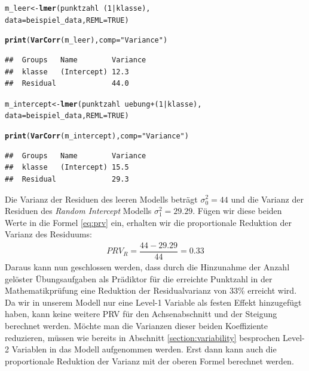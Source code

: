\documentclass[12pt]{article}\usepackage[]{graphicx}\usepackage[]{color}
\makeatletter
\newcommand{\hlnum}[1]{\textcolor[rgb]{0.686,0.059,0.569}{#1}}%
\newcommand{\hlstr}[1]{\textcolor[rgb]{0.192,0.494,0.8}{#1}}%
\newcommand{\hlopt}[1]{\textcolor[rgb]{0,0,0}{#1}}%
\newcommand{\hlstd}[1]{\textcolor[rgb]{0.345,0.345,0.345}{#1}}%
\newcommand{\hlkwb}[1]{\textcolor[rgb]{0.69,0.353,0.396}{#1}}%
\newcommand{\hlkwc}[1]{\textcolor[rgb]{0.333,0.667,0.333}{#1}}%
\newcommand{\hlkwd}[1]{\textcolor[rgb]{0.737,0.353,0.396}{\textbf{#1}}}%
\newenvironment{kframe}{%
 \def\at@end@of@kframe{}%
 \ifinner\ifhmode%
  \def\at@end@of@kframe{\end{minipage}}%
  \begin{minipage}{\columnwidth}%
 \fi\fi%
 \def\FrameCommand##1{\hskip\@totalleftmargin \hskip-\fboxsep
 \colorbox{shadecolor}{##1}\hskip-\fboxsep
     \hskip-\linewidth \hskip-\@totalleftmargin \hskip\columnwidth}%
 \MakeFramed {\advance\hsize-\width
   \@totalleftmargin\z@ \linewidth\hsize
   \@setminipage}}%
 {\par\unskip\endMakeFramed%
 \at@end@of@kframe}
\newenvironment{knitrout}{}{} %
\makeatother
\begin{document}
\singlespacing
\begin{knitrout}
\color{fgcolor}\begin{kframe}
\begin{alltt}
\hlstd{m_leer} \hlkwb{<-} \hlkwd{lmer}\hlstd{(punktzahl} \hlopt{~} \hlstd{(}\hlnum{1} \hlopt{|} \hlstd{klasse),}
                \hlkwc{data} \hlstd{= beispiel_data,} \hlkwc{REML} \hlstd{=} \hlnum{TRUE}\hlstd{)}

\hlkwd{print}\hlstd{(}\hlkwd{VarCorr}\hlstd{(m_leer),} \hlkwc{comp} \hlstd{=} \hlstr{"Variance"}\hlstd{)}
\end{alltt}
\begin{verbatim}
##  Groups   Name        Variance
##  klasse   (Intercept) 12.3    
##  Residual             44.0
\end{verbatim}
\begin{alltt}
\hlstd{m_intercept} \hlkwb{<-} \hlkwd{lmer}\hlstd{(punktzahl} \hlopt{~} \hlstd{uebung} \hlopt{+} \hlstd{(}\hlnum{1} \hlopt{|} \hlstd{klasse),}
                \hlkwc{data} \hlstd{= beispiel_data,} \hlkwc{REML} \hlstd{=} \hlnum{TRUE}\hlstd{)}

\hlkwd{print}\hlstd{(}\hlkwd{VarCorr}\hlstd{(m_intercept),} \hlkwc{comp} \hlstd{=} \hlstr{"Variance"}\hlstd{)}
\end{alltt}
\begin{verbatim}
##  Groups   Name        Variance
##  klasse   (Intercept) 15.5    
##  Residual             29.3
\end{verbatim}
\end{kframe}
\end{knitrout}



Die Varianz der Residuen des leeren Modells beträgt $\sigma_{0}^2 = 44$ und die Varianz der Residuen des \textit{Random Intercept} Modells $\sigma_{1}^2 = 29.29$. Fügen wir diese beiden Werte in die Formel \eqref{eq:prv} ein, erhalten wir die proportionale Reduktion der Varianz des Residuums:
\begin{equation} 
\begin{split}	
 PRV_{R} = \dfrac{44 - 29.29}{44} = 0.33
\end{split}	
\end{equation}
Daraus kann nun geschlossen werden, dass durch die Hinzunahme der Anzahl gelöster Übungsaufgaben als Prädiktor für die erreichte Punktzahl in der Mathematikprüfung eine Reduktion der Residualvarianz von 33\% erreicht wird. Da wir in unserem Modell nur eine Level-1 Variable als festen Effekt hinzugefügt haben, kann keine weitere PRV für den Achsenabschnitt und der Steigung berechnet werden. Möchte man die Varianzen dieser beiden Koeffiziente reduzieren, müssen wie bereits in Abschnitt \ref{section:variability} besprochen Level-2 Variablen in das Modell aufgenommen werden. Erst dann kann auch die proportionale Reduktion der Varianz mit der oberen Formel berechnet werden.
\end{document}
